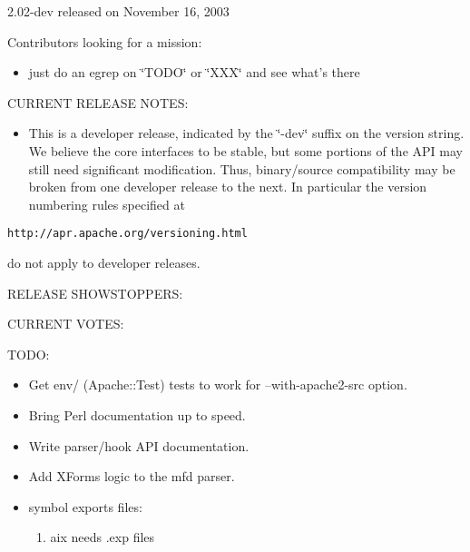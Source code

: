 2.02-dev released on November 16, 2003

Contributors looking for a mission:

\begin{itemize}
\item just do an egrep on \char`\"{}TODO\char`\"{} or \char`\"{}XXX\char`\"{} and see what's there\end{itemize}


CURRENT RELEASE NOTES:

\begin{itemize}
\item This is a developer release, indicated by the \char`\"{}-dev\char`\"{} suffix on the version string. We believe the core interfaces to be stable, but some portions of the API may still need significant modification. Thus, binary/source compatibility may be broken from one developer release to the next. In particular the version numbering rules specified at\end{itemize}


{\tt http://apr.apache.org/versioning.html}

do not apply to developer releases.

RELEASE SHOWSTOPPERS:

CURRENT VOTES:

TODO:

\begin{itemize}
\item Get env/ (Apache::Test) tests to work for --with-apache2-src option.\end{itemize}


\begin{itemize}
\item Bring Perl documentation up to speed.\end{itemize}


\begin{itemize}
\item Write parser/hook API documentation.\end{itemize}


\begin{itemize}
\item Add XForms logic to the mfd parser.\end{itemize}


\begin{itemize}
\item symbol exports files:\begin{enumerate}
\item aix needs .exp files\end{enumerate}
\end{itemize}


